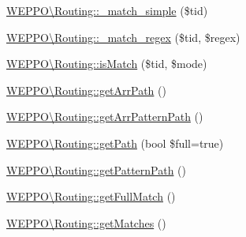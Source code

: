 \begin{DoxyCompactItemize}
\item 
\hyperlink{namespaceWEPPO_1_1Routing_a37c8c9d113c753a86c3710977e76b524}{W\+E\+P\+P\+O\textbackslash{}\+Routing\+::\+\_\+match\+\_\+simple} (\$tid)
\item 
\hyperlink{namespaceWEPPO_1_1Routing_a5f697e4b8a381911ae15ffc52aa1dba5}{W\+E\+P\+P\+O\textbackslash{}\+Routing\+::\+\_\+match\+\_\+regex} (\$tid, \$regex)
\item 
\hyperlink{namespaceWEPPO_1_1Routing_a5a31986f7006de86d7ce6acd824f7f46}{W\+E\+P\+P\+O\textbackslash{}\+Routing\+::is\+Match} (\$tid, \$mode)
\item 
\hyperlink{namespaceWEPPO_1_1Routing_a51ab99a3e6ac08fc2c9457c68beeb59c}{W\+E\+P\+P\+O\textbackslash{}\+Routing\+::get\+Arr\+Path} ()
\item 
\hyperlink{namespaceWEPPO_1_1Routing_a65571499ac307bc6d0c9b45afb9edbc9}{W\+E\+P\+P\+O\textbackslash{}\+Routing\+::get\+Arr\+Pattern\+Path} ()
\item 
\hyperlink{namespaceWEPPO_1_1Routing_a98f5b36932c650c6ca8fb5733422c8a0}{W\+E\+P\+P\+O\textbackslash{}\+Routing\+::get\+Path} (bool \$full=true)
\item 
\hyperlink{namespaceWEPPO_1_1Routing_a1412416873298f139587493ae2970dae}{W\+E\+P\+P\+O\textbackslash{}\+Routing\+::get\+Pattern\+Path} ()
\item 
\hyperlink{namespaceWEPPO_1_1Routing_aff94fd1aaafd49ffc7bef27d30a1432b}{W\+E\+P\+P\+O\textbackslash{}\+Routing\+::get\+Full\+Match} ()
\item 
\hyperlink{namespaceWEPPO_1_1Routing_a8c3ec92eb0a4e31545555eef4755ca67}{W\+E\+P\+P\+O\textbackslash{}\+Routing\+::get\+Matches} ()
\end{DoxyCompactItemize}
